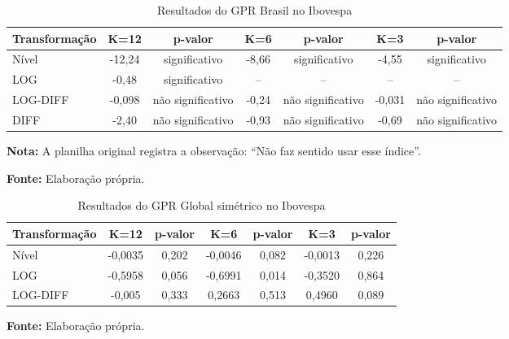 %
%


\begin{table}[H]
\centering
\caption{Resultados do GPR Brasil no Ibovespa}
\label{tab:gpr-brasil-ibov}
\small
\begin{adjustbox}{max width=\textwidth}
\begin{tabular}{@{}lcccccc@{}}
\toprule
Transformação & K=12 & p-valor & K=6 & p-valor & K=3 & p-valor \\
\midrule
Nível & -12,24 & significativo & -8,66 & significativo & -4,55 & significativo \\
LOG & -0,48 & significativo & -- & -- & -- & -- \\
LOG-DIFF & -0,098 & não significativo & -0,24 & não significativo & -0,031 & não significativo \\
DIFF & -2,40 & não significativo & -0,93 & não significativo & -0,69 & não significativo \\
\bottomrule
\end{tabular}
\end{adjustbox}
\vspace{1mm}
\begin{minipage}{\textwidth}
\footnotesize
\textbf{Nota:} A planilha original registra a observação: ``Não faz sentido usar esse índice''.\par
\textbf{Fonte:} Elaboração própria.
\end{minipage}
\end{table}

\begin{table}[H]
\centering
\caption{Resultados do GPR Global simétrico no Ibovespa}
\label{tab:gpr-global-simetrico-ibov}
\small
\begin{adjustbox}{max width=\textwidth}
\begin{tabular}{@{}lcccccc@{}}
\toprule
Transformação & K=12 & p-valor & K=6 & p-valor & K=3 & p-valor \\
\midrule
Nível & -0,0035 & 0,202 & -0,0046 & 0,082 & -0,0013 & 0,226 \\
LOG & -0,5958 & 0,056 & -0,6991 & 0,014 & -0,3520 & 0,864 \\
LOG-DIFF & -0,005 & 0,333 & 0,2663 & 0,513 & 0,4960 & 0,089 \\
\bottomrule
\end{tabular}
\end{adjustbox}
\vspace{1mm}
\begin{minipage}{\textwidth}
\footnotesize
\textbf{Fonte:} Elaboração própria.
\end{minipage}
\end{table}

